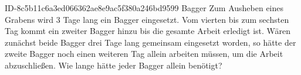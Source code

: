 \begin{exercise}
      {ID-8c5b11c6a3ed066362ae8e9ac5f380a246bd9599}
      {Bagger}
  \ifproblem\problem
    Zum Ausheben eines Grabens wird 3 Tage lang ein Bagger eingesetzt. Vom vierten bis
    zum sechsten Tag kommt ein zweiter Bagger hinzu bis die gesamte Arbeit erledigt ist.
    Wären zunächst beide Bagger drei Tage lang gemeinsam eingesetzt worden, so
    hätte der zweite Bagger noch einen weiteren Tag allein arbeiten müssen, um
    die Arbeit abzuschließen. Wie lange hätte jeder Bagger allein benötigt?
  \fi
\end{exercise}
